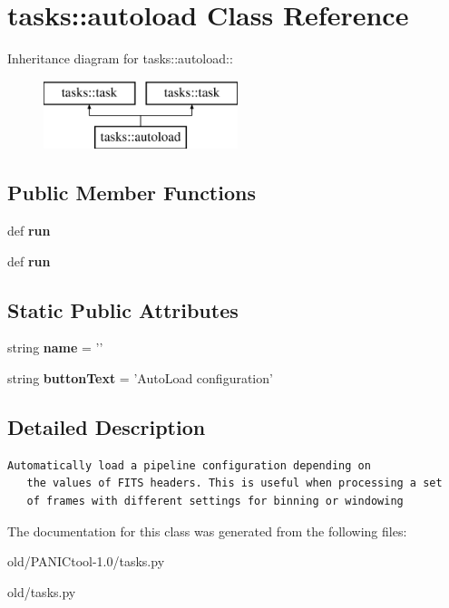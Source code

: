 \section{tasks::autoload Class Reference}
\label{classtasks_1_1autoload}
Inheritance diagram for tasks::autoload::\begin{figure}[H]
\begin{center}
\leavevmode
\includegraphics[height=2cm]{classtasks_1_1autoload}
\end{center}
\end{figure}
\subsection*{Public Member Functions}
\begin{CompactItemize}
\item 
def \textbf{run}\label{classtasks_1_1autoload_cbc6ebe4d736fc571c9e08024c68b88b}

\item 
def \textbf{run}\label{classtasks_1_1autoload_cbc6ebe4d736fc571c9e08024c68b88b}

\end{CompactItemize}
\subsection*{Static Public Attributes}
\begin{CompactItemize}
\item 
string \textbf{name} = '{\bfautoload}'\label{classtasks_1_1autoload_1141ed7ffd19b60ebecbc0b7bc699800}

\item 
string \textbf{button\-Text} = 'Auto\-Load configuration'\label{classtasks_1_1autoload_5e7ed731bc97b0437792affe7a10279a}

\end{CompactItemize}


\subsection{Detailed Description}


\footnotesize\begin{verbatim}Automatically load a pipeline configuration depending on
   the values of FITS headers. This is useful when processing a set
   of frames with different settings for binning or windowing
\end{verbatim}
\normalsize
 



The documentation for this class was generated from the following files:\begin{CompactItemize}
\item 
old/PANICtool-1.0/tasks.py\item 
old/tasks.py\end{CompactItemize}
